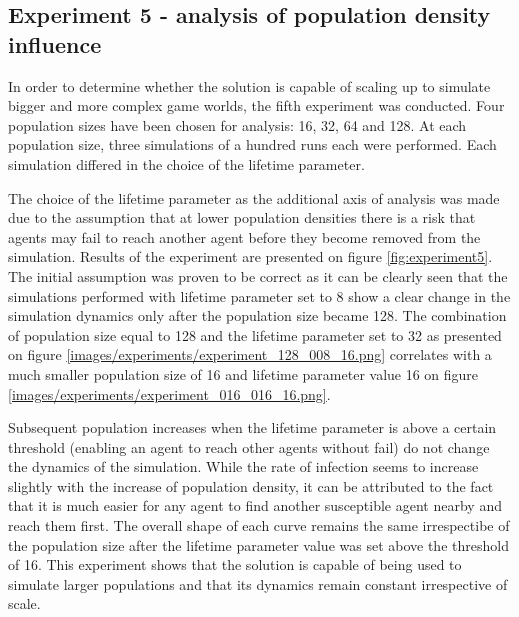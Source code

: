 \subsection{Experiment 5 - analysis of population density influence}

In order to determine whether the solution is capable of scaling up to simulate bigger and more complex game worlds, the fifth experiment was conducted.
Four population sizes have been chosen for analysis: 16, 32, 64 and 128.
At each population size, three simulations of a hundred runs each were performed.
Each simulation differed in the choice of the lifetime parameter.

The choice of the lifetime parameter as the additional axis of analysis was made due to the assumption that at lower population densities there is a risk that agents may fail to reach another agent before they become removed from the simulation.
Results of the experiment are presented on figure \ref{fig:experiment5}.
The initial assumption was proven to be correct as it can be clearly seen that the simulations performed with lifetime parameter set to 8 show a clear change in the simulation dynamics only after the population size became 128.
The combination of population size equal to 128 and the lifetime parameter set to 32 as presented on figure \ref{images/experiments/experiment_128_008_16.png} correlates with a much smaller population size of 16 and lifetime parameter value 16 on figure \ref{images/experiments/experiment_016_016_16.png}.

Subsequent population increases when the lifetime parameter is above a certain threshold (enabling an agent to reach other agents without fail) do not change the dynamics of the simulation.
While the rate of infection seems to increase slightly with the increase of population density, it can be attributed to the fact that it is much easier for any agent to find another susceptible agent nearby and reach them first.
The overall shape of each curve remains the same irrespectibe of the population size after the lifetime parameter value was set above the threshold of 16.
This experiment shows that the solution is capable of being used to simulate larger populations and that its dynamics remain constant irrespective of scale.

